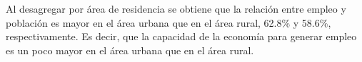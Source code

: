  Al desagregar por área de residencia se obtiene que la relación entre empleo y población es mayor en el área urbana que en el área rural, 62.8\% y 58.6\%, respectivamente. Es decir, que la capacidad de la economía para generar empleo es un poco mayor en el área urbana que en el área rural.